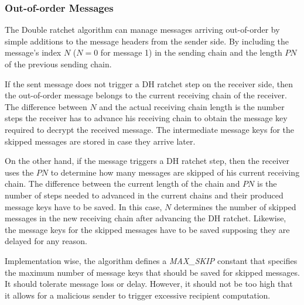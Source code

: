 \subsubsection{Out-of-order Messages}\label{oooMsgs}
The Double ratchet algorithm can manage messages arriving out-of-order by simple additions to the message headers from the sender side. By including the message's index $N$ ($N=0$ for message 1) in the sending chain and the length $PN$ of the previous sending chain.
\par
If the sent message does not trigger a DH ratchet step on the receiver side, then the out-of-order message belongs to the current receiving chain of the receiver. The difference between $N$ and the actual receiving chain length is the number steps the receiver has to advance his receiving chain to obtain the message key required to decrypt the received message. The intermediate message keys for the skipped messages are stored in case they arrive later.
\par
On the other hand, if the message triggers a DH ratchet step, then the receiver uses the $PN$ to determine how many messages are skipped of his current receiving chain. The difference between the current length of the chain and $PN$ is the number of steps needed to advanced in the current chains and their produced message keys have to be saved. In this case, $N$ determines the number of skipped messages in the new receiving chain after advancing the DH ratchet. Likewise, the message keys for the skipped messages have to be saved supposing they are delayed for any reason.
\par
Implementation wise, the algorithm defines a \textit{MAX\_SKIP} constant that specifies the maximum number of message keys that should be saved for skipped messages. It should tolerate message loss or delay. However, it should not be too high that it allows for a malicious sender to trigger excessive recipient computation.
